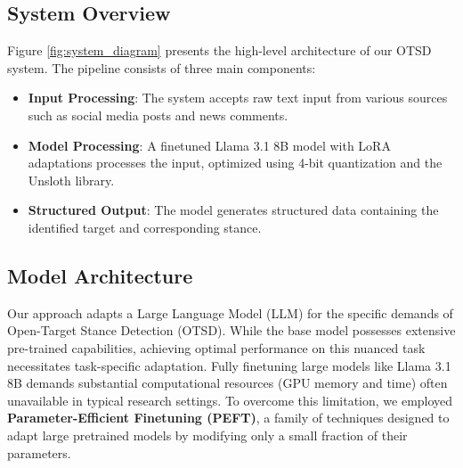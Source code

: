 \documentclass[twocolumn,11pt,letterpaper]{article}
\begin{document}
\subsection{System Overview}
\label{sec:system_overview}

Figure \ref{fig:system_diagram} presents the high-level architecture of our OTSD system. The pipeline consists of three main components:

\begin{itemize}
    \item \textbf{Input Processing}: The system accepts raw text input from various sources such as social media posts and news comments.
    \item \textbf{Model Processing}: A finetuned Llama 3.1 8B model with LoRA adaptations processes the input, optimized using 4-bit quantization and the Unsloth library.
    \item \textbf{Structured Output}: The model generates structured data containing the identified target and corresponding stance.
\end{itemize}

\begin{figure*}[t]
\centering

\caption{High-Level OTSD System Diagram showing the complete pipeline from raw text input to structured stance and target output. The system utilizes a finetuned Llama 3.1 8B model with LoRA adaptations, optimized using 4-bit quantization and the Unsloth library.}
\label{fig:system_diagram}
\end{figure*}

\begin{figure*}[t]
\centering

\caption{Detailed Research Architecture showing the complete pipeline from training data through model finetuning to evaluation. The system combines VAST and TSE datasets for training, processes through a finetuned Llama 3.1 8B model, and evaluates outputs using multiple methods including Gemini, DeepSeek, and BERTweet for semantic similarity assessment.}
\label{fig:research_arch}
\end{figure*}

\subsection{Model Architecture}
\label{sec:model_arch}

Our approach adapts a Large Language Model (LLM) for the specific demands of Open-Target Stance Detection (OTSD). While the base model possesses extensive pre-trained capabilities, achieving optimal performance on this nuanced task necessitates task-specific adaptation. Fully finetuning large models like Llama 3.1 8B demands substantial computational resources (GPU memory and time) often unavailable in typical research settings. To overcome this limitation, we employed \textbf{Parameter-Efficient Finetuning (PEFT)}, a family of techniques designed to adapt large pretrained models by modifying only a small fraction of their parameters.
\end{document}
